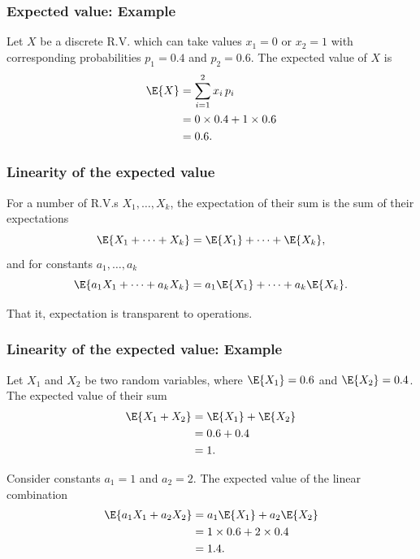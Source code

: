 \documentclass[compress]{beamer}\usepackage[]{graphicx}\usepackage[]{xcolor}
\begin{document}
\begin{frame}[fragile]
  \frametitle{Expected value: Example}
    Let $X$ be a discrete R.V. which can take values $x_1 = 0$ or $x_2 = 1$ with corresponding probabilities $p_1 = 0.4$ and $p_2 = 0.6$. The expected value of $X$ is
    \begin{equation*}
      \begin{aligned}
        \E{X} &= \sum_{i = 1}^2 x_i\, p_i\\
              &= 0 \times 0.4 + 1 \times 0.6\\
              &= 0.6.
      \end{aligned}
    \end{equation*}
\end{frame}


\begin{frame}[fragile]
  \frametitle{Linearity of the expected value}
    For a number of R.V.s $X_1, \dots, X_k$, the expectation of their sum is the sum of their expectations
      \[ \E{X_1 + \dots + X_k} = \E{X_1} + \dots + \E{X_k}, \]
    and for constants $a_1, \dots, a_k$
      \[ \E{a_1 X_1 + \dots + a_k X_k} = a_1 \E{X_1} + \dots + a_k \E{X_k}. \]

    That it, expectation is transparent to  operations.
\end{frame}


\begin{frame}[fragile]
  \frametitle{Linearity of the expected value: Example}
    Let $X_1$ and $X_2$ be two random variables, where $\E{X_1} = 0.6$ and $\E{X_2} = 0.4$. The expected value of their sum
    \begin{equation*}
      \begin{aligned}
        \E{X_1 + X_2} &= \E{X_1} + \E{X_2}\\
                      &= 0.6 + 0.4 \\
                      &= 1.
      \end{aligned}
    \end{equation*}

    Consider constants $a_1 = 1$ and $a_2 = 2$. The expected value of the linear combination
    \begin{equation*}
      \begin{aligned}
        \E{a_1X_1 + a_2X_2} &= a_1 \E{X_1} + a_2 \E{X_2} \\
        & = 1 \times 0.6 + 2 \times 0.4 \\
        & = 1.4.
      \end{aligned}
    \end{equation*}
\end{frame}
\end{document}
